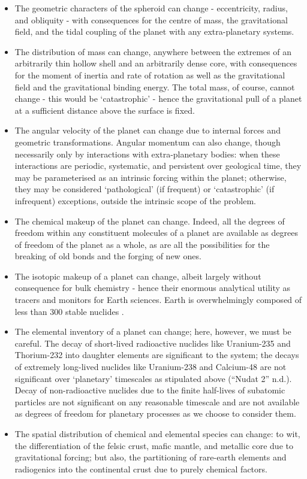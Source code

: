 \documentclass[a4paper,11pt,oneside]{book}
\begin{document}
\begin{itemize}
\item The geometric characters of the spheroid can change - eccentricity, radius, and obliquity - with consequences for the centre of mass, the gravitational field, and the tidal coupling of the planet with any extra-planetary systems.


\item The distribution of mass can change, anywhere between the extremes of an arbitrarily thin hollow shell and an arbitrarily dense core, with consequences for the moment of inertia and rate of rotation as well as the gravitational field and the gravitational binding energy. The total mass, of course, cannot change - this would be `catastrophic' - hence the gravitational pull of a planet at a sufficient distance above the surface is fixed.


\item The angular velocity of the planet can change due to internal forces and geometric transformations. Angular momentum can also change, though necessarily only by interactions with extra-planetary bodies: when these interactions are periodic, systematic, and persistent over geological time, they may be parameterised as an intrinsic forcing within the planet; otherwise, they may be considered `pathological' (if frequent) or `catastrophic' (if infrequent) exceptions, outside the intrinsic scope of the problem.


\item The chemical makeup of the planet can change. Indeed, all the degrees of freedom within any constituent molecules of a planet are available as degrees of freedom of the planet as a whole, as are all the possibilities for the breaking of old bonds and the forging of new ones.


\item The isotopic makeup of a planet can change, albeit largely without consequence for bulk chemistry - hence their enormous analytical utility as tracers and monitors for Earth sciences. Earth is overwhelmingly composed of less than 300 stable nuclides \cite{Thoennessen2011-jq}.


\item The elemental inventory of a planet can change; here, however, we must be careful. The decay of short-lived radioactive nuclides like Uranium-235 and Thorium-232 into daughter elements are significant to the system; the decays of extremely long-lived nuclides like Uranium-238 and Calcium-48 are not significant over `planetary' timescales as stipulated above (``Nudat 2'' n.d.). Decay of non-radioactive nuclides due to the finite half-lives of subatomic particles are not significant on any reasonable timescale and are not available as degrees of freedom for planetary processes as we choose to consider them.


\item The spatial distribution of chemical and elemental species can change: to wit, the differentiation of the felsic crust, mafic mantle, and metallic core due to gravitational forcing; but also, the partitioning of rare-earth elements and radiogenics into the continental crust due to purely chemical factors.
\end{itemize}
\end{document}

